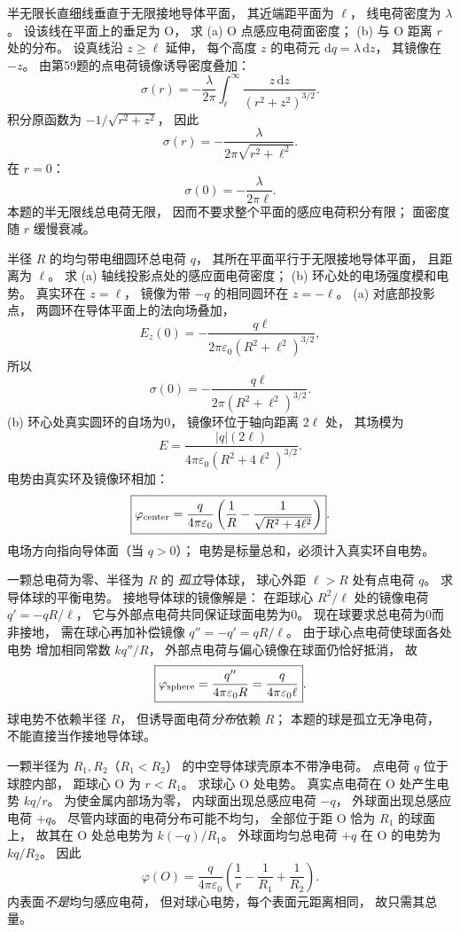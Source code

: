 半无限长直细线垂直于无限接地导体平面，
其近端距平面为 $\ell$，
线电荷密度为 $\lambda$。
设该线在平面上的垂足为 O，
求 (a) O 点感应电荷面密度；
(b) 与 O 距离 $r$ 处的分布。
\exsolution
设真线沿 $z\ge\ell$ 延伸，
每个高度 $z$ 的电荷元
$\mathrm dq=\lambda\,\mathrm dz$，
其镜像在 $-z$。
由第59题的点电荷镜像诱导密度叠加：
\[
\sigma(r)=
-\frac{\lambda}{2\pi}
\int_\ell^\infty
\frac{z\,\mathrm dz}{(r^2+z^2)^{3/2}}.
\]
积分原函数为
$-1/\sqrt{r^2+z^2}$，
因此
\[
\boxed{\sigma(r)=
-\frac{\lambda}{2\pi\sqrt{r^2+\ell^2}}}.
\]
在 $r=0$：
\[
\boxed{\sigma(0)=-\frac{\lambda}{2\pi\ell}}.
\]
\excheck 本题的半无限线总电荷无限，
因而不要求整个平面的感应电荷积分有限；
面密度随 $r$ 缓慢衰减。

半径 $R$ 的均匀带电细圆环总电荷 $q$，
其所在平面平行于无限接地导体平面，
且距离为 $\ell$。
求 (a) 轴线投影点处的感应面电荷密度；
(b) 环心处的电场强度模和电势。
\exsolution
真实环在 $z=\ell$，
镜像为带 $-q$ 的相同圆环在 $z=-\ell$。
(a) 对底部投影点，
两圆环在导体平面上的法向场叠加，
\[
E_z(0)=
-\frac{q\ell}{2\pi\varepsilon_0(R^2+\ell^2)^{3/2}},
\]
所以
\[
\boxed{\sigma(0)=
-\frac{q\ell}{2\pi(R^2+\ell^2)^{3/2}}}.
\]
(b) 环心处真实圆环的自场为0，
镜像环位于轴向距离 $2\ell$ 处，
其场模为
\[
\boxed{E=
\frac{|q|(2\ell)}
{4\pi\varepsilon_0(R^2+4\ell^2)^{3/2}}}.
\]
电势由真实环及镜像环相加：
\[
\boxed{\varphi_{\rm center}=
\frac q{4\pi\varepsilon_0}
\left(\frac1R-\frac1{\sqrt{R^2+4\ell^2}}\right)}.
\]
\excheck 电场方向指向导体面（当 $q>0$）；
电势是标量总和，必须计入真实环自电势。

一颗总电荷为零、半径为 $R$ 的
\emph{孤立}导体球，
球心外距 $\ell>R$ 处有点电荷 $q$。
求导体球的平衡电势。
\exsolution
接地导体球的镜像解是：
在距球心 $R^2/\ell$ 处的镜像电荷
$q'=-qR/\ell$，
它与外部点电荷共同保证球面电势为0。
现在球要求总电荷为0而非接地，
需在球心再加补偿镜像
$q''=-q'=qR/\ell$。
由于球心点电荷使球面各处电势
增加相同常数
$kq''/R$，
外部点电荷与偏心镜像在球面仍恰好抵消，
故
\[
\boxed{\varphi_{\rm sphere}
=\frac{q''}{4\pi\varepsilon_0R}
=\frac{q}{4\pi\varepsilon_0\ell}}.
\]
\excheck 球电势不依赖半径 $R$，
但诱导面电荷\emph{分布}依赖 $R$；
本题的球是孤立无净电荷，
不能直接当作接地导体球。

一颗半径为 $R_1,R_2$（$R_1<R_2$）
的中空导体球壳原本不带净电荷。
点电荷 $q$ 位于球腔内部，
距球心 O 为 $r<R_1$。
求球心 O 处电势。
\exsolution
真实点电荷在 O 处产生电势 $kq/r$。
为使金属内部场为零，
内球面出现总感应电荷 $-q$，
外球面出现总感应电荷 $+q$。
尽管内球面的电荷分布可能不均匀，
全部位于距 O 恰为 $R_1$ 的球面上，
故其在 O 处总电势为
$k(-q)/R_1$。
外球面均匀总电荷 $+q$ 在 O 的电势为
$kq/R_2$。
因此
\[
\boxed{\varphi(O)=
\frac q{4\pi\varepsilon_0}
\left(\frac1r-\frac1{R_1}+\frac1{R_2}\right)}.
\]
\excheck 内表面\emph{不是}均匀感应电荷，
但对球心电势，每个表面元距离相同，
故只需其总量。

